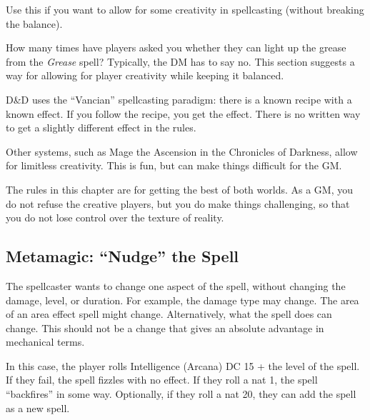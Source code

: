 \documentclass[twocolumn]{dndbook}
\begin{document}
\begin{emphasisParagraph}
	Use this if you want to allow for some creativity in spellcasting (without breaking the balance).
\end{emphasisParagraph}

\begin{emphasisParagraph}
	How many times have players asked you whether they can light up the grease from the \emph{Grease} spell?
	Typically, the DM has to say no. This section suggests a way for allowing for player creativity while keeping it balanced.
\end{emphasisParagraph}

D\&D uses the ``Vancian'' spellcasting paradigm: there is a known recipe with a known effect.
If you follow the recipe, you get the effect.
There is no written way to get a slightly different effect in the rules.\par

Other systems, such as Mage the Ascension in the Chronicles of Darkness, allow for limitless creativity.
This is fun, but can make things difficult for the GM.\par

The rules in this chapter are for getting the best of both worlds.
As a GM, you do not refuse the creative players, but you do make things challenging, so that you do not lose control over the texture of reality.

\subsection{Metamagic: ``Nudge'' the Spell}

The spellcaster wants to change one aspect of the spell, without changing the damage, level, or duration.
For example, the damage type may change.
The area of an area effect spell might change.
Alternatively, what the spell does can change.
This should not be a change that gives an absolute advantage in mechanical terms.\par

In this case, the player rolls Intelligence (Arcana) DC 15 + the level of the spell.
If they fail, the spell fizzles with no effect.
If they roll a nat 1, the spell ``backfires'' in some way.
Optionally, if they roll a nat 20, they can add the spell as a new spell.\par

\end{document}
